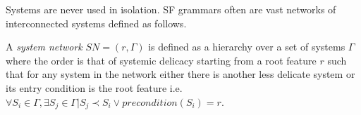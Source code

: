 Systems are never used in isolation. SF grammars often are vast networks of interconnected systems defined as follows. 


\begin{definition}\label{def:system-network}
    A \textit{system network} $SN=(r,\Gamma)$ is defined as a hierarchy over a set of systems $\Gamma$ where the order is that of systemic delicacy starting from a root feature $r$ such that for any system in the network either there is another less delicate system or its entry condition is the root feature i.e. \mbox{$\forall S_{i} \in \Gamma, \exists S_{j} \in \Gamma | S_{j} \prec S_{i} \lor precondition(S_{i})=r$}. 
\end{definition}

